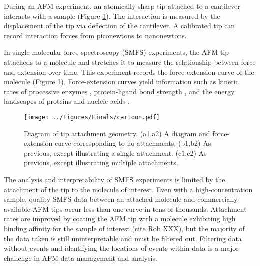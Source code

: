 \documentclass[%
  aip,12pt,tightenlines,
  amsthm,
 amsmath,amssymb
]{article}
\newcommand{\fRef}[1]{Figure \ref{figure:#1}}
\newcommand{\fLabel}[1]{\label{figure:#1}}
\newcommand{\pl}[0]{\vspace{6pt}}
\newcommand{\pEndF}[0]{ \\ }
\newcommand{\pStartF}[0]{ }
\newcommand{\figwidth}[0]{\linewidth}
\newcommand{\singlemol}[0]{SMFS}
\newcommand{\citePRH}[1]{\cite{#1}}
\begin{document}
During an AFM experiment, an atomically sharp tip attached to a cantilever interacts with a sample (\fRef{Cartoon}). The interaction is measured by the displacement of the tip via deflection of the cantilever. A calibrated tip can record interaction forces from piconewtons to nanonewtons. \pl

In single molecular force spectroscopy (\singlemol{}) experiments, the AFM tip attacheds to a molecule and stretches it to measure the relationship between force and extension over time. This experiment records the force-extension curve of the molecule (\fRef{Cartoon}). Force-extension curves yield information such as kinetic rates of processive enzymes \citePRH{comstock_direct_2015}, protein-ligand bond strength \citePRH{yuan_energy_2000}, and the energy landscapes of proteins and nucleic acids \citePRH{dudko_Theory_2008}. \pl

\begin{figure}
\centering
\texttt{[image: ../Figures/Finals/cartoon.pdf]}%
\caption[Diagram of AFM attachment geometry]{\fLabel{Cartoon}\pStartF Diagram of tip attachment geometry. (a1,a2) A diagram and force-extension curve corresponding to no attachments. (b1,b2) As previous, except illustrating a single attachment. (c1,c2) As previous, except illustrating multiple attachments. \pEndF }
\end{figure}


The analysis and interpretability of \singlemol{} experiments is limited by the attachment of the tip to the molecule of interest. Even with a high-concentration sample, quality \singlemol{} data between an attached molecule and commercially-available AFM tips occur less than one curve in tens of thousands\cite{bosshart_reference-free_2012}. Attachment rates are improved by coating the AFM tip with a molecule exhibiting high binding affinity for the sample of interest (cite Rob XXX), but the majority of the data taken is still uninterpretable and must be filtered out. Filtering data without events and identifying the locations of events within data is a major challenge in AFM data management and analysis.\pl
\end{document}

